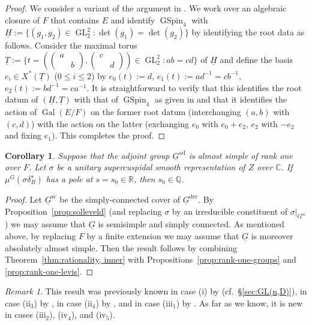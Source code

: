 \documentclass[a4paper]{amsart}
\numberwithin{equation}{section}
\newtheorem{cor}[thm]{Corollary}
\theoremstyle{remark}
\newtheorem{remark}[thm]{Remark}
\theoremstyle{definition}
\DeclareMathOperator{\ad}{ad}
\DeclareMathOperator{\Gal}{Gal}
\newcommand{\C}{\mathbb{C}}
\newcommand{\Q}{\mathbb{Q}}
\newcommand{\R}{\mathbb{R}}
\DeclareMathOperator{\GSpin}{GSpin}
\DeclareMathOperator{\GL}{GL}
\newcommand{\alggrp}[1]{\underline{#1}}
\newcommand{\der}{\mathrm{der}}
\renewcommand{\sc}{\mathrm{sc}}
\begin{document}
\begin{proof}
  We consider a variant of the argument in \cite[Proposition 2.1]{MR3719299}.
  We work over an algebraic closure of $F$ that contains $E$ and identify $\GSpin_4$ with $\alggrp{H} := \{(g_1,g_2) \in \GL_2^2 : \det(g_1) = \det(g_2)\}$
  by identifying the root data as follows. 
  Consider the maximal torus $\alggrp{T} := \{t = ((\begin{smallmatrix}a \\ &b\end{smallmatrix}),(\begin{smallmatrix}c \\ &d\end{smallmatrix})) \in \GL_2^2 : ab=cd\}$ of $\alggrp{H}$
  and define the basis $e_i \in X^*(\alggrp{T})$ ($0 \le i \le 2$) by $e_0(t) := d$, $e_1(t) := ad^{-1} = cb^{-1}$, $e_2(t) := bd^{-1} = ca^{-1}$.
  It is straightforward to verify that this identifies the root datum of $(\alggrp{H},\alggrp{T})$ with that of $\GSpin_4$ as given in \cite[Proposition 2.4]{MR1913914}
  and that it identifies the action of $\Gal(E/F)$ on the former root datum (interchanging $(a,b)$ with $(c,d)$) with the action on the latter
  (exchanging $e_0$ with $e_0+e_2$, $e_2$ with $-e_2$ and fixing $e_1$).
  This completes the proof.
\end{proof}

\begin{cor}\label{cor:rationality, rank one}
  Suppose that the adjoint group $\alggrp{G}^{\ad}$ is almost simple of rank one over $F$.
  Let $\sigma$ be a unitary supercuspidal smooth representation of $Z$ over $\C$.
  If $\mu^G(\sigma\delta_{B}^{s})$ has a pole at $s = s_{0}\in \R$, then $s_{0}\in \Q$.
\end{cor}

\begin{proof}
  Let $\alggrp G^{\sc}$ be the simply-connected cover of $\alggrp{G}^{\der}$.
  By Proposition~\ref{prop:solleveld} (and replacing $\sigma$ by an irreducible constituent of $\sigma|_{G^\sc}$) we may assume that $\alggrp G$ is semisimple and simply connected.
  As mentioned above, by replacing $F$ by a finite extension we may assume that $\alggrp{G}$ is moreover absolutely almost simple.
  Then the result follows by combining Theorem~\ref{thm:rationality, inner} with Propositions~\ref{prop:rank-one-groups} and \ref{prop:rank-one-levis}.
\end{proof}

\begin{remark}\label{rk:rank-1-known-cases}
  This result was previously known in case (i) by \cite{MR1040995} (cf.\ \S\ref{sec:GL(n,D)}), in case (ii$_3$) by \cite[\S7]{MR734788}, in case (ii$_4$) by \cite[\S3.1]{Konno}, and in case (iii$_1$) by \cite[\S3]{MR1749954}.
  As far as we know, it is new in cases (iii$_2$), (iv$_4$), and (iv$_5$).
\end{remark}
\end{document}
